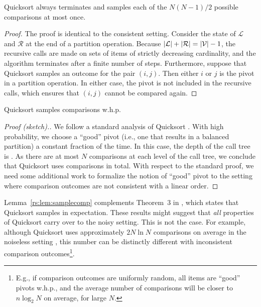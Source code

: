 \begin{lemma}
\label{rs:lem:termination}
Quicksort always terminates and samples each of the $N(N\!-\!1) / 2$ possible comparisons at most once.
\end{lemma}

\begin{proof}
The proof is identical to the consistent setting.
Consider the state of $\mathcal{L}$ and $\mathcal{R}$ at the end of a partition operation.
Because $\lvert\mathcal{L}\rvert + \lvert\mathcal{R}\rvert = \lvert\mathcal{V}\rvert - 1$, the recursive calls are made on sets of items of strictly decreasing cardinality, and the algorithm terminates after a finite number of steps.
Furthermore, suppose that Quicksort samples an outcome for the pair $(i, j)$.
Then either $i$ or $j$ is the pivot in a partition operation.
In either case, the pivot is not included in the recursive calls, which ensures that $(i, j)$ cannot be compared again.
\end{proof}

\begin{lemma}
\label{rs:lem:samplecomp}
Quicksort samples  comparisons w.h.p.
\end{lemma}

\begin{proof}[Proof (sketch).]
We follow a standard analysis of Quicksort \citep[see, e.g.,][Section 3.3.3]{dubhashi2009concentration}.
With high probability, we choose a ``good'' pivot (i.e., one that results in a balanced partition) a constant fraction of the time.
In this case, the depth of the call tree is .
As there are at most $N$ comparisons at each level of the call tree, we conclude that Quicksort uses  comparisons in total.
With respect to the standard proof, we need some additional work to formalize the notion of ``good'' pivot to the setting where comparison outcomes are not consistent with a linear order.
\end{proof}

Lemma~\ref{rs:lem:samplecomp} complements Theorem~$3$ in \citet{ailon2010preference}, which states that Quicksort samples  in expectation.
These results might suggest that \emph{all} properties of Quicksort carry over to the noisy setting.
This is not the case.
For example, although Quicksort uses approximately $2N \ln N$ comparisons on average in the noiseless setting \citep{sedgewick2011algorithms}, this number can be distinctly different with inconsistent comparison outcomes\footnote{E.g., if comparison outcomes are uniformly random, all items are ``good'' pivots w.h.p., and the average number of comparisons will be closer to $n \log_2 N$ on average, for large $N$.}.

